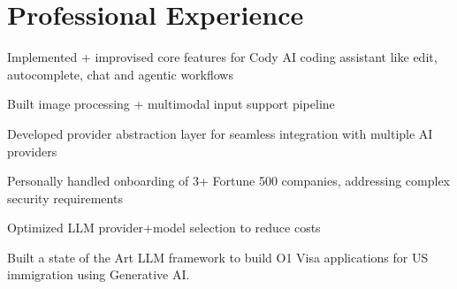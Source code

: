 \documentclass[]{deedy-resume-openfont}
\begin{document}
\begin{minipage}[t]{0.74\textwidth}


\section{Professional Experience}

\begin{tightemize}

\vspace{\topsep} %
\item Implemented + improvised core features for Cody AI coding assistant like edit, autocomplete, chat and agentic workflows
\item Built image processing + multimodal input support pipeline 
\item Developed provider abstraction layer for seamless integration with multiple AI providers
\item Personally handled onboarding of 3+ Fortune 500 companies, addressing complex security requirements
\item Optimized LLM provider+model selection to reduce costs 

\end{tightemize}


\begin{tightemize}

\vspace{\topsep} %
\item Built a state of the Art LLM framework to build O1 Visa applications for US immigration using Generative AI. \href{https://www.immigrantfirst.ai/}{}

\end{tightemize}


\sectionsep
{}
\descript{  }
\begin{tightemize}


\end{tightemize}
\end{minipage}
\end{document}
